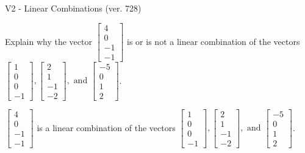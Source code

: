 \begin{exercise}
  \begin{exerciseTitle}V2 - Linear Combinations (ver. 728)\end{exerciseTitle}
  \begin{exerciseStatement}
    Explain why the vector \(\left[\begin{array}{c}
4 \\
0 \\
-1 \\
-1
\end{array}\right]\)  is or is not a linear 
	combination of the vectors \(\left[\begin{array}{c}
1 \\
0 \\
0 \\
-1
\end{array}\right] , \left[\begin{array}{c}
2 \\
1 \\
-1 \\
-2
\end{array}\right] , \text{ and } \left[\begin{array}{c}
-5 \\
0 \\
1 \\
2
\end{array}\right]\).
	


  \end{exerciseStatement}
  \begin{exerciseAnswer}
   \(\left[\begin{array}{c}
4 \\
0 \\
-1 \\
-1
\end{array}\right]\) 
  	 is  
	a linear combination of the vectors \(\left[\begin{array}{c}
1 \\
0 \\
0 \\
-1
\end{array}\right] , \left[\begin{array}{c}
2 \\
1 \\
-1 \\
-2
\end{array}\right] , \text{ and } \left[\begin{array}{c}
-5 \\
0 \\
1 \\
2
\end{array}\right]\).

	
  


  \end{exerciseAnswer}
\end{exercise}